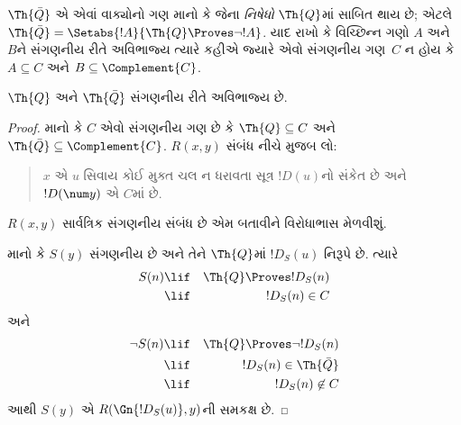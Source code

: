 \documentclass[../../../include/open-logic-section]{subfiles}
\begin{document}



$\Th{\bar Q}$ એ એવાં
વાક્યોનો ગણ માનો કે જેના
{\em નિષેધો} $\Th{Q}$માં
સાબિત થાય છે; એટલે
$\Th{\bar Q} = \Setabs{!A}{\Th{Q} \Proves
  \lnot !A}$.
યાદ રાખો કે વિચ્છિન્ન
ગણો $A$ અને $B$ને
સંગણનીય રીતે અવિભાજ્ય
ત્યારે કહીએ જ્યારે એવો
સંગણનીય ગણ~$C$ ન હોય
કે $A \subseteq C$ અને
$B \subseteq \Complement{C}$.

\begin{lem}
$\Th{Q}$ અને
$\Th{\bar Q}$ સંગણનીય
રીતે અવિભાજ્ય છે.
\end{lem}

\begin{proof}
માનો કે $C$ એવો સંગણનીય
ગણ છે કે $\Th{Q} \subseteq C$
અને $\Th{\bar Q} \subseteq \Complement{C}$.
$R(x,y)$ સંબંધ નીચે મુજબ લો:
\begin{quote}
$x$ એ $u$ સિવાય કોઈ મુક્ત ચલ ન ધરાવતા સૂત્ર $!D(u)$નો
સંકેત છે અને $!D(\num y)$
એ $C$માં છે.
\end{quote}
$R(x,y)$ સાર્વત્રિક
સંગણનીય સંબંધ છે એમ
બતાવીને વિરોધાભાસ
મેળવીશું.

માનો કે $S(y)$ સંગણનીય
છે અને તેને $\Th{Q}$માં
$!D_S(u)$ નિરૂપે છે.
ત્યારે
\begin{eqnarray*}
S(n) & \lif & \Th{Q} \Proves !D_S(n) \\
& \lif & !D_S(n) \in C
\end{eqnarray*}
અને
\begin{eqnarray*}
\lnot S(n) & \lif & \Th{Q} \Proves \lnot !D_S(n) \\
& \lif & !D_S(n) \in \Th{\bar Q} \\
& \lif & !D_S(n) \not\in C
\end{eqnarray*}
આથી $S(y)$ એ
$R(\Gn{!D_S(u)},y)$ની
સમકક્ષ છે.
\end{proof}
\end{document}

